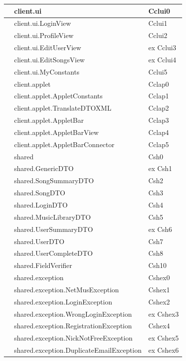 \begin{footnotesize}
\begin{longtable}[h]{|l|l|l|}
& client.ui  &  Cclui0 \\\hline 
& client.ui.LoginView  &  Cclui1 \\\hline 
& client.ui.ProfileView  &  Cclui2 \\\hline 
\bo{--} & client.ui.EditUserView  &  ex Cclui3 \\\hline 
\bo{--} & client.ui.EditSongsView  &  ex Cclui4 \\\hline 
\bo{+} & client.ui.MyConstants  &  Cclui5 \\\hline  
& client.applet  &  Cclap0  \\\hline 
\bo{+} & client.applet.AppletConstants  &  Cclap1 \\\hline 
\bo{+} & client.applet.TranslateDTOXML  &  Cclap2  \\\hline 
\bo{+} & client.applet.AppletBar  &  Cclap3  \\\hline 
\bo{+} & client.applet.AppletBarView  &  Cclap4  \\\hline 
\bo{+} & client.applet.AppletBarConnector  &  Cclap5  \\\hline 
& shared  &  Csh0 \\\hline 
\bo{--} & shared.GenericDTO  &  ex Csh1 \\\hline 
& shared.SongSummaryDTO  &  Csh2 \\\hline 
& shared.SongDTO  &  Csh3 \\\hline 
& shared.LoginDTO  &  Csh4 \\\hline 
& shared.MusicLibraryDTO  &  Csh5 \\\hline 
\bo{--} & shared.UserSummaryDTO  &  ex Csh6 \\\hline 
& shared.UserDTO  &  Csh7 \\\hline 
& shared.UserCompleteDTO  &  Csh8 \\\hline 
\bo{+} & shared.FieldVerifier  &  Csh10 \\\hline 
& shared.exception  &  Cshex0 \\\hline 
& shared.exception.NetMusException  &  Cshex1 \\\hline 
& shared.exception.LoginException  &  Cshex2 \\\hline 
\bo{--} & shared.exception.WrongLoginException  &  ex Cshex3 \\\hline 
& shared.exception.RegistrationException  &  Cshex4 \\\hline 
\bo{--} & shared.exception.NickNotFreeException  &  ex Cshex5 \\\hline 
\bo{--} & shared.exception.DuplicateEmailException  &  ex Cshex6 \\\hline 

\end{longtable}
\end{footnotesize}
